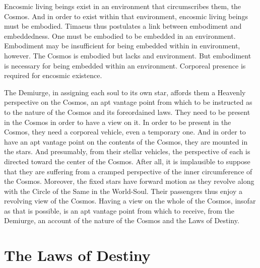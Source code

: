 Encosmic living beings exist in an environment that circumscribes them, the Cosmos. And in order to exist within that environment, encosmic living beings must be embodied. Timaeus thus postulates a link between embodiment and embeddedness. One must be embodied to be embedded in an environment. Embodiment may be insufficient for being embedded within in environment, however. The Cosmos is embodied but lacks and environment. But embodiment is necessary for being embedded within an environment. Corporeal presence is required for encosmic existence.

The Demiurge, in assigning each soul to its own star, affords them a Heavenly perspective on the Cosmos, an apt vantage point from which to be instructed as to the nature of the Cosmos and its foreordained laws. They need to be present in the Cosmos in order to have a view on it. In order to be present in the Cosmos, they need a corporeal vehicle, even a temporary one. And in order to have an apt vantage point on the contents of the Cosmos, they are mounted in the stars. And presumably, from their stellar vehicles, the perspective of each is directed toward the center of the Cosmos. After all, it is implausible to suppose that they are suffering from a cramped perspective of the inner circumference of the Cosmos. Moreover, the fixed stars have forward motion as they revolve along with the Circle of the Same in the World-Soul. Their passengers thus enjoy a revolving view of the Cosmos. Having a view on the whole of the Cosmos, insofar as that is possible, is an apt vantage point from which to receive, from the Demiurge, an account of the nature of the Cosmos and the Laws of Destiny.


\section{The Laws of Destiny} %
\label{sec:the_laws_of_destiny}

